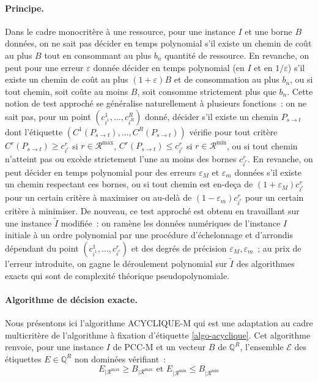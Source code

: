 \documentclass[10pt,francais]{llncs}
\begin{document}
{\paragraph{Principe.}
Dans le cadre monocrit\`ere \`a une ressource, pour une instance $I$ et une borne $B$ donn\'ees, on ne sait pas d\'ecider en temps polynomial s'il existe un chemin de co\^ut au plus $B$ tout en consommant au plus $b_n$ quantit\'e de ressource. En revanche, on peut pour une erreur $\varepsilon$ donn\'ee d\'ecider en temps polynomial (en $I$ et en $1/\varepsilon$) s'il existe un chemin de co\^ut au plus $(1+\varepsilon)B$ et de consommation au plus $b_n$, ou si tout chemin, soit co\^ute au moins $B$, soit consomme strictement plus que $b_n$. Cette notion de test approch\'e se g\'en\'eralise naturellement \`a plusieurs fonctions~: on ne sait pas, pour un point $(c^1_{i^1},\ldots,c^R_{i^R})$ donn\'e, d\'ecider s'il existe un chemin $P_{s \to t}$ dont l'\'etiquette $(C^1(P_{s \to t}),\ldots,C^R(P_{s \to t}))$ v\'erifie pour tout crit\`ere $C^r(P_{s \to t})\geq c^r_{i^r}$ si $r\in \mathscr{R}^{\max}$, $C^r(P_{s \to t})\leq c^r_{i^r}$ si $r\in \mathscr{R}^{\min}$, ou si tout chemin n'atteint pas ou exc\`ede strictement l'une au moins des bornes $c^r_{i^r}$. En revanche, on peut d\'ecider en temps polynomial pour des erreurs $\varepsilon_M$ et $\varepsilon_m$ donn\'ees s'il existe un chemin respectant ces bornes, ou si tout chemin est en-de\c{c}a de $(1+\varepsilon_M)c^r_{i^r}$ pour un certain crit\`ere \`a maximiser ou au-del\`a de  $(1-\varepsilon_m)c^r_{i^r}$ pour un certain crit\`ere \`a minimiser. De nouveau, ce test approch\'e est obtenu en travaillant sur une instance $\tilde{I}$ modifi\'ee~: on ram\`ene les donn\'ees num\'eriques de l'instance $I$ initiale \`a un ordre polynomial par une proc\'edure d'\'echelonnage et d'arrondis d\'ependant du point $(c^1_{i^1},\ldots,c^r_{i^r})$ et des degr\'es de pr\'ecision $\varepsilon_M,\varepsilon_m$~; au prix de l'erreur introduite, on gagne le d\'eroulement polynomial sur $\tilde{I}$ des algorithmes exacts qui sont de complexit\'e th\'eorique pseudopolynomiale. 
	

\paragraph{Algorithme de d\'ecision exacte.}
Nous pr\'esentons ici l'algorithme ACYCLIQUE-M qui est une adaptation au cadre multicrit\`ere de l'algorithme \`a fixation d'\'etiquette \ref{algo-acyclique}. Cet algorithme renvoie, pour une instance $I$ de PCC-M et un vecteur $B$ de $\mathbb{Q}^R$, l'ensemble $\mathscr{E}$ des \'etiquettes $E\in \mathbb{Q}^R$ non domin\'ees v\'erifiant~:
$$E_{|\mathscr{R}^{\max}} \geq B_{|\mathscr{R}^{\max}}\textrm{ et }E_{|\mathscr{R}^{\min}} \leq B_{|\mathscr{R}^{\min}}$$ 

}
\end{document}
